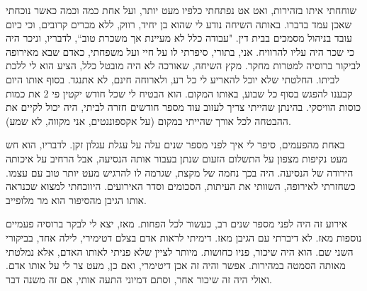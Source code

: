 \documentclass[]{article}
\begin{document}
	שוחחתי איתו בזהירות, ואט אט נפתחתי כלפיו מעט יותר, ועל אחת כמה וכמה כאשר נוכחתי שאכן עמד בדברו. באותה השיחה נודע לי שהוא בן יחיד, רווק, ללא מכרים קרובים, וכי כיום עובד בניהול מסמכים בבית דין. "עבודה כלל לא מעיינת אך משכרת טוב``, לדבריו, וניכר היה כי שכר היה עליו להרוויח. אני, בתורי, סיפרתי לו על חיי ועל משפחתי, כאדם שבא מאירופה לביקור ברוסיה למטרות מחקר. מקץ השיחה, שאורכה לא היה מובטל כלל, הציע הוא לי ללכת לביתו. החלטתי שלא יוכל להאריע לי כל רע, ולארוחה חינם, לא אתנגד. בסוף אותו היום קבענו להפגש בסוף כל שבוע, באותו המקום. הוא הבטיח לי שכל חודש יקטין פי 2 את כמות כוסות הוויסקי. בהינתן שהייתי צריך לעזוב עוד מספר חודשים חזרה לביתי, היה יכול לקיים את ההבטחה לכל אורך שהייתי במקום (על אקספוננטים, אני מקווה, לא שמע). 
	
	באחת מהפעמים, סיפר לי איך לפני מספר שנים עלה על עגלת עגלון זקן. לדבריו, הוא חש מעט נקיפות מצפון על התשלום הזעום שנתן בעבור אותה הנסיעה, אבל הרחיב על איכותה הירודה של הנסיעה. היה בכך נחמה של מקצת, שגרמה לו להרגיש מעט יותר טוב עם עצמו. כשחזרתי לאירופה, השוותי את העיתות, הסכומים וסדר האירועים. היווכחתי למצוא שכנראה אותו הגיבן מהסיפור הוא מר מלופייב. 
	
	אירוע זה היה לפני מספר שנים רב, כעשור לכל הפחות. מאז, יצא לי לבקר ברוסיה פעמיים נוספות מאז. לא דיברתי עם הגיבן מאז. דימיתי לראות אדם בצלם דטימירי, לילה אחד, בביקורי השני שם. הוא היה שיכור, פניו כחושות. מיותר לציין שלא פניתי לאותו האדם, אלא נמלטתי מאותה הסמטה במהירות. אפשר והיה זה אכן דיטימרי, ואם כן, מעט צר לי על אותו אדם. ואולי היה זה שיכור אחר, וסתם דמיוני התעה אותי, אם זה משנה דבר. 
	
	
\end{document}
